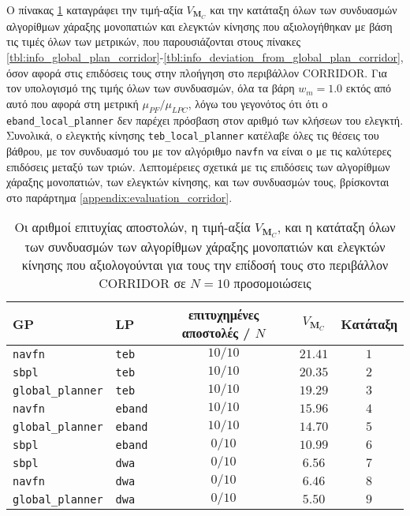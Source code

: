 Ο πίνακας \ref{tbl:rank_corridor} καταγράφει την τιμή-αξία $V_{\bm{M}_C}$ και
την κατάταξη όλων των συνδυασμών αλγορίθμων χάραξης μονοπατιών και ελεγκτών
κίνησης που αξιολογήθηκαν με βάση τις τιμές όλων των μετρικών, που
παρουσιάζονται στους πίνακες
\ref{tbl:info_global_plan_corridor}-\ref{tbl:info_deviation_from_global_plan_corridor},
όσον αφορά στις επιδόσεις τους στην πλοήγηση στο περιβάλλον CORRIDOR. Για τον
υπολογισμό της τιμής όλων των συνδυασμών, όλα τα βάρη $w_m = 1.0$ εκτός από
αυτό που αφορά στη μετρική $\mu_{PF} / \mu_{LPC}$, λόγω του γεγονότος ότι ότι ο
\texttt{eband\_local\_planner} δεν παρέχει πρόσβαση στον αριθμό των κλήσεων του
ελεγκτή. Συνολικά, ο ελεγκτής κίνησης \texttt{teb\_local\_planner} κατέλαβε
όλες τις θέσεις του βάθρου, με τον συνδυασμό του με τον αλγόριθμο
\texttt{navfn} να είναι ο με τις καλύτερες επιδόσεις μεταξύ των τριών.
Λεπτομέρειες σχετικά με τις επιδόσεις των αλγορίθμων χάραξης μονοπατιών, των
ελεγκτών κίνησης, και των συνδυασμών τους, βρίσκονται στο παράρτημα
\ref{appendix:evaluation_corridor}.

\begin{table}\centering
\renewcommand{\arraystretch}{1.3}
\begin{tabular}{llccc}
  GP                        & LP              & επιτυχημένες αποστολές / $N$ & $V_{\bm{M}_C}$ & Κατάταξη \\ \toprule
  \texttt{navfn}            & \texttt{teb}    & $10/10$                      & $21.41$        & $1$      \\
  \texttt{sbpl}             & \texttt{teb}    & $10/10$                      & $20.35$        & $2$      \\
  \texttt{global\_planner}  & \texttt{teb}    & $10/10$                      & $19.29$        & $3$      \\
  \texttt{navfn}            & \texttt{eband}  & $10/10$                      & $15.96$        & $4$      \\
  \texttt{global\_planner}  & \texttt{eband}  & $10/10$                      & $14.70$        & $5$      \\
  \texttt{sbpl}             & \texttt{eband}  & $0/10$                       & $10.99$        & $6$      \\
  \texttt{sbpl}             & \texttt{dwa}    & $0/10$                       & $6.56$         & $7$      \\
  \texttt{navfn}            & \texttt{dwa}    & $0/10$                       & $6.46$         & $8$      \\
  \texttt{global\_planner}  & \texttt{dwa}    & $0/10$                       & $5.50$         & $9$      \\ \bottomrule
\end{tabular}
\caption{\small Οι αριθμοί επιτυχίας αποστολών, η τιμή-αξία $V_{\bm{M}_C}$, και
         η κατάταξη όλων των συνδυασμών των αλγορίθμων χάραξης μονοπατιών και
         ελεγκτών κίνησης που αξιολογούνται για τους την επίδοσή τους στο
         περιβάλλον CORRIDOR σε $N=10$ προσομοιώσεις}
\label{tbl:rank_corridor}
\end{table}


